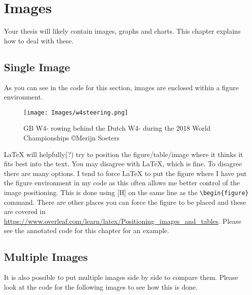 \chapter{Images}
Your thesis will likely contain images, graphs and charts. This chapter explains how to deal with these. 
\section{Single Image}

As you can see in the code for this section, images are enclosed within a figure environment.

\begin{figure} [H] %
    \centering %
    \texttt{[image: Images/w4steering.png]} %
    \caption{GB W4- rowing behind the Dutch W4- during the 2018 World Championships \copyright Merijn Soeters} %
    \label{fig:four} %
\end{figure}

\LaTeX{} will helpfully(?) try to position the figure/table/image where it thinks it fits best into the text. You may disagree with \LaTeX{}, which is fine. To disagree there are many options. I tend to force \LaTeX{} to put the figure where I have put the figure environment in my code as this often allows me better control of the image positioning. This is done using [H] on the same line as the \verb+\begin{figure}+ command. There are other places you can force the figure to be placed and these are covered in \url{https://www.overleaf.com/learn/latex/Positioning_images_and_tables}. Please see the annotated code for this chapter for an example.

\section{Multiple Images}

It is also possible to put multiple images side by side to compare them. Please look at the code for the following images to see how this is done.

